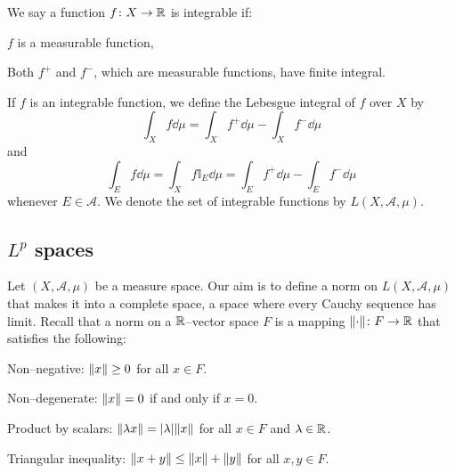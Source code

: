 \begin{definition*}
	We say a function $f \colon X \rightarrow \mathbb{R}$ is integrable if:
	\begin{enumeratedef}
		\item $f$ is a measurable function,
		\item Both $f^+$ and $f^-$, which are measurable functions, have finite integral.
	\end{enumeratedef}
	If $f$ is an integrable function, we define the Lebesgue integral of $f$ over $X$ by
	\[
		\int_X f \dd{\mu} = \int_X f^+ \dd{\mu} - \int_X f^- \dd{\mu}	
	\]
	and
	\[
		\int_E f \dd{\mu} = \int_X f \mathbb{I}_E \dd{\mu} = \int_E f^+ \dd{\mu} - \int_E f^- \dd{\mu}	
	\]
	whenever $E \in \mathcal{A}$. We denote the set of integrable functions by $L(X, \mathcal{A}, \mu)$.
\end{definition*}

\subsection{\texorpdfstring{$L^p$}{L--p} spaces}

Let $(X, \mathcal{A}, \mu)$ be a measure space. Our aim is to define a norm on
$L(X, \mathcal{A}, \mu)$ that makes it into a complete space, \ie a space where
every Cauchy sequence has limit. Recall that a norm on a $\mathbb{R}$--vector space
$F$ is a mapping $\norm{\cdot} \colon F \rightarrow \mathbb{R}$ that satisfies the
following:
\begin{enumeratedef}
	\item Non--negative: $\norm{x} \geq 0$ for all $x \in F$.
	\item Non--degenerate: $\norm{x} = 0$ if and only if $x = 0$.
	\item Product by scalars: $\norm{\lambda x} = \abs{\lambda} \norm{x}$ for all $x \in F$ and $\lambda \in \mathbb{R}$.
	\item Triangular inequality: $\norm{x + y} \leq \norm{x} + \norm{y}$ for all $x, y \in F$.
\end{enumeratedef}

